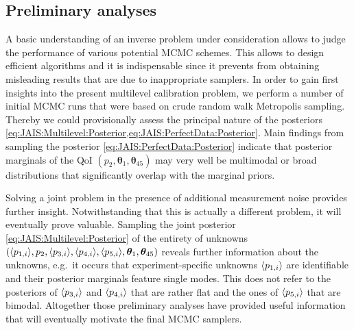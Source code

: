 \subsection{Preliminary analyses}
A basic understanding of an inverse problem under consideration allows to judge the performance of various potential MCMC schemes.
This allows to design efficient algorithms and it is indispensable since it prevents from obtaining misleading results that are due to inappropriate samplers.
In order to gain first insights into the present multilevel calibration problem, we perform a number of initial MCMC runs that were based on crude random walk Metropolis sampling.
Thereby we could provisionally assess the principal nature of the posteriors \cref{eq:JAIS:Multilevel:Posterior,eq:JAIS:PerfectData:Posterior}.
Main findings from sampling the posterior \cref{eq:JAIS:PerfectData:Posterior} indicate that posterior marginals of the QoI
\((p_2,\bm{\theta}_1,\bm{\theta}_{45})\) may very well be multimodal or broad distributions that significantly overlap with the marginal priors.
\par %
Solving a joint problem in the presence of additional measurement noise provides further insight.
Notwithstanding that this is actually a different problem, it will eventually prove valuable.
Sampling the joint posterior \cref{eq:JAIS:Multilevel:Posterior} of the entirety of unknowns \((\langle{p_{1,i}}\rangle,p_2,\langle{p_{3,i}}\rangle,\langle{p_{4,i}}\rangle,\langle{p_{5,i}}\rangle,\bm{\theta}_1,\bm{\theta}_{45})\)
reveals further information about the unknowns, e.g.\ it occurs that experiment-specific unknowns \(\langle{p_{1,i}}\rangle\) are identifiable and their posterior marginals feature single modes.
This does not refer to the posteriors of \(\langle{p_{3,i}}\rangle\) and \(\langle{p_{4,i}}\rangle\) that are rather flat and the ones of \(\langle{p_{5,i}}\rangle\) that are bimodal.
Altogether those preliminary analyses have provided useful information that will eventually motivate the final MCMC samplers.

